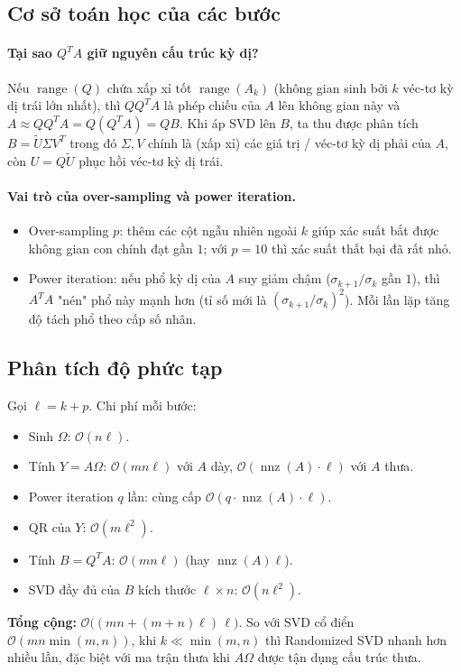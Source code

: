 \subsection{Cơ sở toán học của các bước}

\paragraph{Tại sao $Q^T A$ giữ nguyên cấu trúc kỳ dị?}
Nếu $\operatorname{range}(Q)$ chứa xấp xỉ tốt $\operatorname{range}(A_k)$
(không gian sinh bởi $k$ véc-tơ kỳ dị trái lớn nhất), thì $QQ^T A$ là phép chiếu
của $A$ lên không gian này và $A \approx QQ^T A = Q(Q^T A) = QB$. Khi áp SVD lên
$B$, ta thu được phân tích $B = \widetilde{U}\Sigma V^T$ trong đó
$\Sigma, V$ chính là (xấp xỉ) các giá trị / véc-tơ kỳ dị phải của $A$, còn
$U = Q\widetilde{U}$ phục hồi véc-tơ kỳ dị trái.

\paragraph{Vai trò của over-sampling và power iteration.}
\begin{itemize}
    \item Over-sampling $p$: thêm các cột ngẫu nhiên ngoài $k$ giúp xác suất
    bắt được không gian con chính đạt gần $1$; với $p=10$ thì xác suất
    thất bại đã rất nhỏ.
    \item Power iteration: nếu phổ kỳ dị của $A$ suy giảm chậm
    ($\sigma_{k+1}/\sigma_k$ gần $1$), thì $A^T A$ "nén" phổ này mạnh hơn
    (tỉ số mới là $(\sigma_{k+1}/\sigma_k)^2$). Mỗi lần lặp tăng độ tách phổ
    theo cấp số nhân.
\end{itemize}

\subsection{Phân tích độ phức tạp}

Gọi $\ell = k+p$. Chi phí mỗi bước:
\begin{itemize}
    \item Sinh $\Omega$: $\mathcal{O}(n\ell)$.
    \item Tính $Y = A\Omega$: $\mathcal{O}(mn\ell)$ với $A$ dày,
    $\mathcal{O}(\operatorname{nnz}(A)\cdot \ell)$ với $A$ thưa.
    \item Power iteration $q$ lần: cùng cấp $\mathcal{O}(q\cdot \operatorname{nnz}(A)\cdot \ell)$.
    \item QR của $Y$: $\mathcal{O}(m\ell^2)$.
    \item Tính $B = Q^T A$: $\mathcal{O}(mn\ell)$ (hay $\operatorname{nnz}(A)\ell$).
    \item SVD đầy đủ của $B$ kích thước $\ell\times n$: $\mathcal{O}(n\ell^2)$.
\end{itemize}
\textbf{Tổng cộng:} $\mathcal{O}\big((mn + (m+n)\ell)\,\ell\big)$.
So với SVD cổ điển $\mathcal{O}(mn\min(m,n))$, khi $k \ll \min(m,n)$ thì
Randomized SVD nhanh hơn nhiều lần, đặc biệt với ma trận thưa khi $A\Omega$
được tận dụng cấu trúc thưa.


